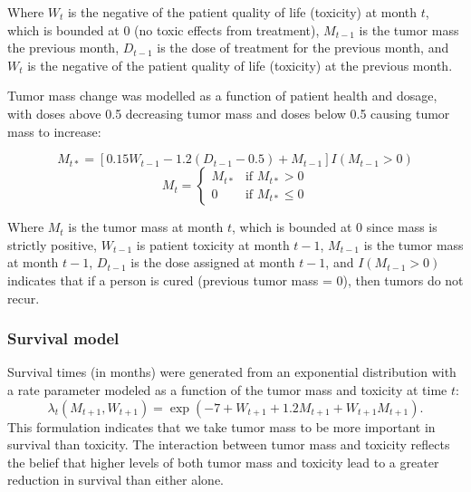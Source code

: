 \documentclass[12pt]{article}
\begin{document}
Where $W_{t}$ is the negative of the patient quality of life (toxicity) at month $t$, which is bounded at 0 (no toxic effects from treatment),
$M_{t-1}$ is the tumor mass the previous month,
$D_{t-1}$ is the dose of treatment for the previous month, and
$W_{t}$ is the negative of the patient quality of life (toxicity) at the previous month.

Tumor mass change was modelled as a function of patient health and dosage, with doses above 0.5 decreasing tumor mass and doses below 0.5 causing tumor mass to increase:

\begin{equation}
M_{t*} = [0.15 W_{t-1} - 1.2 (D_{t-1} - 0.5) + M_{t - 1}] I(M_{t-1} > 0)
\end{equation}
\begin{equation}
M_{t} = \begin{cases}
  M_{t*} &\text{if } M_{t*} > 0 \\
  0 &\text{if } M_{t*} \leq 0
\end{cases}
\end{equation}

Where $M_{t}$ is the tumor mass at month $t$, which is bounded at 0 since mass is strictly positive,
$W_{t-1}$ is patient toxicity at month $t - 1$,
$M_{t-1}$ is the tumor mass at month $t - 1$,
$D_{t-1}$ is the dose assigned at month $t - 1$, and
$I(M_{t-1} > 0)$ indicates that if a person is cured (previous tumor mass = 0), then tumors do not recur.


\subsubsection{Survival model} %
\label{ssub:survival_model}

Survival times (in months) were generated from an exponential distribution with a rate parameter modeled as a function of the tumor mass and toxicity at time $t$:
\begin{equation}
  \lambda_{t}(M_{t+1}, W_{t+1}) = \exp(-7 + W_{t+1} + 1.2 M_{t+1} + W_{t+1} M_{t+1}).
\end{equation}
This formulation indicates that we take tumor mass to be more important in survival than toxicity. The interaction between tumor mass and toxicity reflects the belief that higher levels of both tumor mass and toxicity lead to a greater reduction in survival than either alone.

\end{document}

